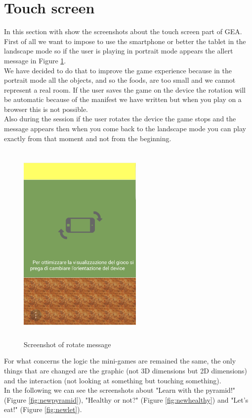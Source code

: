 \section{Touch screen}
In this section with show the screenshots about the touch screen part of GEA.\\
First of all we want to impose to use the smartphone or better the tablet in the landscape mode so if the user is playing in portrait mode appears the allert message in Figure \ref{fig:rotate}.\\
We have decided to do that to improve the game experience because in the portrait mode all the objects, and so the foods, are too small and we cannot represent a real room. If the user saves the game on the device the rotation will be automatic because of the manifest we have written but when you play on a browser this is not possible.\\
Also during the session if the user rotates the device the game stops and the message appears then when you come back to the landscape mode you can play exactly from that moment and not from the beginning.
\newpage
\begin{figure}[H]
\centering
\includegraphics[width=6cm, height=10cm]{immagini/rotate.png}
\caption{Screenshot of rotate message}\label{fig:rotate}
\end{figure}
For what concerns the logic the mini-games are remained the same, the only things that are changed are the graphic (not 3D dimensions but 2D dimensions) and the interaction (not looking at something but touching something).\\
In the following we can see the screenshots about "Learn with the pyramid!" (Figure \ref{fig:newpyramid}), "Healthy or not?" (Figure \ref{fig:newhealthy}) and "Let's eat!" (Figure \ref{fig:newlet}).
